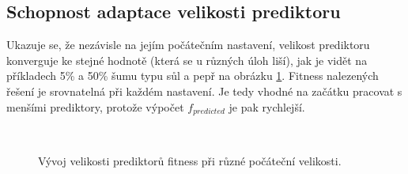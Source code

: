 \documentclass[fleqn,11pt]{ExcelAtFIT} %
\begin{document}
\subsection{Schopnost adaptace velikosti prediktoru}

Ukazuje se, že nezávisle na jejím počátečním nastavení, velikost prediktoru konverguje ke stejné hodnotě (která se u různých úloh liší), jak je vidět na příkladech 5\% a 50\% šumu typu sůl a pepř na obrázku \ref{fig:InitialSize}. Fitness nalezených řešení je srovnatelná při každém nastavení. Je tedy vhodné na začátku pracovat s menšími prediktory, protože výpočet $f_\mathit{predicted}$ je pak rychlejší.

\begin{figure}[h]
    \centering
    \\
    \caption{Vývoj velikosti prediktorů fitness při různé počáteční velikosti.}
    \label{fig:InitialSize}
\end{figure}
\end{document}
